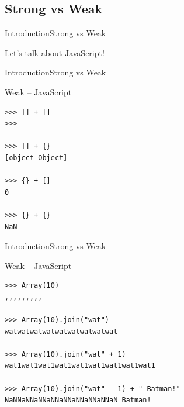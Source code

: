 \documentclass[10pt]{beamer}
\begin{document}
\subsection{Strong vs Weak}

\begin{frame}[fragile]{Introduction}{Strong vs Weak}
\begin{center}
		\Huge Let's talk about JavaScript!
\end{center}
\end{frame}


\begin{frame}[fragile]{Introduction}{Strong vs Weak}
\begin{center}
	
\begin{block}{Weak -- JavaScript}
	
\begin{lstlisting}
>>> [] + []  
>>>

>>> [] + {} 
[object Object]

>>> {} + []  
0

>>> {} + {}  
NaN
\end{lstlisting}


\end{block}

\end{center}

\end{frame}


\begin{frame}[fragile]{Introduction}{Strong vs Weak}
\begin{center}
		
\begin{block}{Weak -- JavaScript}
			
\begin{lstlisting}
>>> Array(10)
,,,,,,,,,

>>> Array(10).join("wat")
watwatwatwatwatwatwatwatwat

>>> Array(10).join("wat" + 1)
wat1wat1wat1wat1wat1wat1wat1wat1wat1

>>> Array(10).join("wat" - 1) + " Batman!"      
NaNNaNNaNNaNNaNNaNNaNNaNNaN Batman!
\end{lstlisting}
			
			
\end{block}
		
\end{center}
	
\end{frame}
\end{document}
